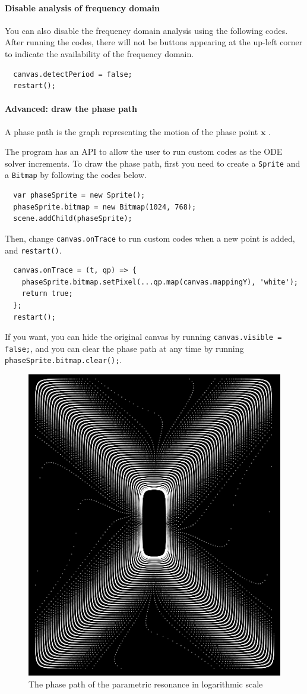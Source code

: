 \documentclass[12pt]{article}
\begin{document}
\paragraph{Disable analysis of frequency domain}

You can also disable the frequency domain analysis using the following codes.
After running the codes, there will not be buttons appearing at the up-left corner
to indicate the availability of the frequency domain.

\begin{verbatim}
  canvas.detectPeriod = false;
  restart();
\end{verbatim}

\paragraph{Advanced: draw the phase path}

A phase path is the graph representing the motion of the phase point $\mathbf x$ \cite[p. 146]{landau1976mechanics}\cite[p. 68]{arnold1989mathmech}.

The program has an API to allow the user to run custom codes as the ODE solver increments.
To draw the phase path, first you need to create a \verb!Sprite! and a \verb!Bitmap!
by following the codes below.

\begin{verbatim}
  var phaseSprite = new Sprite();
  phaseSprite.bitmap = new Bitmap(1024, 768);
  scene.addChild(phaseSprite);
\end{verbatim}

Then, change \verb!canvas.onTrace! to run custom codes when a new point is added,
and \verb!restart()!.

\begin{verbatim}
  canvas.onTrace = (t, qp) => {
    phaseSprite.bitmap.setPixel(...qp.map(canvas.mappingY), 'white');
    return true;
  };
  restart();
\end{verbatim}

If you want, you can hide the original canvas by running \verb!canvas.visible = false;!,
and you can clear the phase path at any time by running \verb!phaseSprite.bitmap.clear();!.

\begin{figure}
  \centering
  \includegraphics[width=0.3\linewidth]{parametric_resonance_logarithmic_phase.png}
  \caption{The phase path of the parametric resonance in logarithmic scale}
  \label{fig:parametric_phase}
\end{figure}
\end{document}
